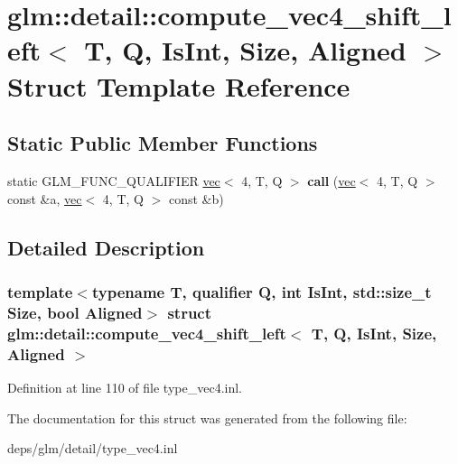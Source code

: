 \hypertarget{structglm_1_1detail_1_1compute__vec4__shift__left}{}\section{glm\+:\+:detail\+:\+:compute\+\_\+vec4\+\_\+shift\+\_\+left$<$ T, Q, Is\+Int, Size, Aligned $>$ Struct Template Reference}
\label{structglm_1_1detail_1_1compute__vec4__shift__left}
\subsection*{Static Public Member Functions}
\begin{DoxyCompactItemize}
\item 
\mbox{\label{structglm_1_1detail_1_1compute__vec4__shift__left_a2a88686231e04bbb8855908e3655a2dc}} 
static G\+L\+M\+\_\+\+F\+U\+N\+C\+\_\+\+Q\+U\+A\+L\+I\+F\+I\+ER \hyperlink{structglm_1_1vec}{vec}$<$ 4, T, Q $>$ {\bfseries call} (\hyperlink{structglm_1_1vec}{vec}$<$ 4, T, Q $>$ const \&a, \hyperlink{structglm_1_1vec}{vec}$<$ 4, T, Q $>$ const \&b)
\end{DoxyCompactItemize}


\subsection{Detailed Description}
\subsubsection*{template$<$typename T, qualifier Q, int Is\+Int, std\+::size\+\_\+t Size, bool Aligned$>$\newline
struct glm\+::detail\+::compute\+\_\+vec4\+\_\+shift\+\_\+left$<$ T, Q, Is\+Int, Size, Aligned $>$}



Definition at line 110 of file type\+\_\+vec4.\+inl.



The documentation for this struct was generated from the following file\+:\begin{DoxyCompactItemize}
\item 
deps/glm/detail/type\+\_\+vec4.\+inl\end{DoxyCompactItemize}
